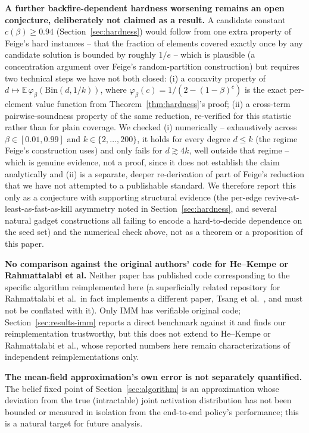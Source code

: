 \documentclass[journal]{IEEEtran}
\begin{document}
\textbf{A further backfire-dependent hardness worsening remains an open
conjecture, deliberately not claimed as a result.} A candidate constant
$c(\beta)\ge0.94$ (Section~\ref{sec:hardness}) would
follow from one extra property of Feige's hard instances -- that the
fraction of elements covered exactly once by any candidate solution is
bounded by roughly $1/e$ -- which is plausible (a concentration argument
over Feige's random-partition construction) but requires two technical
steps we have not both closed: (i) a concavity property of
$d\mapsto\mathbb{E}\,\varphi_\beta(\mathrm{Bin}(d,1/k))$, where
$\varphi_\beta(c)=1/(2-(1-\beta)^c)$ is the exact per-element value
function from Theorem~\ref{thm:hardness}'s proof; (ii) a cross-term
pairwise-soundness property of the same reduction, re-verified for this
statistic rather than for plain coverage. We checked (i) numerically --
exhaustively across $\beta\in[0.01,0.99]$ and $k\in\{2,\dots,200\}$, it
holds for every degree $d\le k$ (the regime Feige's construction uses) and
only fails for $d\gtrsim4k$, well outside that regime -- which is genuine
evidence, not a proof, since it does not establish the claim analytically
and (ii) is a separate, deeper re-derivation of part of Feige's reduction
that we have not attempted to a publishable standard. We therefore report
this only as a conjecture with supporting structural evidence (the
per-edge revive-at-least-as-fast-as-kill asymmetry noted in
Section~\ref{sec:hardness}, and several natural gadget constructions all
failing to encode a hard-to-decide dependence on the seed set) and the
numerical check above, not as a theorem or a proposition of this paper.

\textbf{No comparison against the original authors' code for He--Kempe or
Rahmattalabi et al.} Neither paper has published code corresponding to the
specific algorithm reimplemented here (a superficially related repository
for Rahmattalabi et al.\ in fact implements a different paper,
Tsang et al.~\cite{tsang2019group}, and must not be conflated with it).
Only IMM has verifiable original code; Section~\ref{sec:results-imm}
reports a direct benchmark against it and finds our reimplementation
trustworthy, but this does not extend to He--Kempe or Rahmattalabi et
al., whose reported numbers here remain characterizations of independent
reimplementations only.

\textbf{The mean-field approximation's own error is not separately
quantified.} The belief fixed point of Section~\ref{sec:algorithm} is an
approximation whose deviation from the true (intractable) joint
activation distribution has not been bounded or measured in isolation from
the end-to-end policy's performance; this is a natural target for future
analysis.
\end{document}

